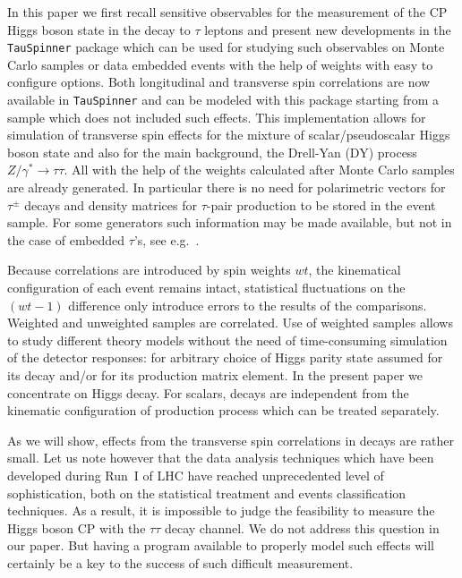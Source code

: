 \documentclass[12pt]{article}
\begin{document}
In  this paper we first recall sensitive observables for the measurement of the
CP Higgs boson state in the decay to $\tau$ leptons and present new developments in the 
{\tt TauSpinner} package which can be used for studying such observables on 
 Monte Carlo samples or data embedded events with the help of weights with easy to configure options. Both longitudinal and 
 transverse spin 
correlations are now available in {\tt TauSpinner} \cite{Czyczula:2012ny,Banerjee:2012ez, TauSpinner2014} 
and can be modeled with this package 
starting from a sample which does not included such effects.  This implementation allows for simulation 
of transverse spin effects for the mixture of scalar/pseudoscalar Higgs boson state and also for 
the main background, the Drell-Yan (DY) process $Z/\gamma^* \to \tau \tau$. 
All with the help of the weights calculated after Monte Carlo samples are already generated. In particular there is no need for polarimetric vectors for $\tau^\pm $ decays and density matrices for $\tau$-pair 
production to be stored in the event sample.  For some generators 
such information may be made available,  
but not  in the case of embedded $\tau$'s, see e.g.~\cite{ATLASHtautau}. 

Because correlations are introduced  by spin weights $wt$, the kinematical configuration of each event remains
intact,  
 statistical fluctuations on the $(wt-1)$ difference only 
introduce errors to the results of  
the comparisons.  Weighted and unweighted samples are correlated.  
Use of weighted samples allows  to study different theory models
without the need of time-consuming simulation of  the
detector responses: for arbitrary 
choice of  Higgs parity state assumed for its decay and/or for its production matrix element.
In the present paper we  concentrate on Higgs decay. For scalars, decays are independent from the
kinematic configuration of  production process which can be treated separately. 

As we will show, effects from the transverse spin correlations in decays are rather small. 
Let us note however that the data analysis techniques which have been developed during Run~I of LHC
have reached unprecedented level of sophistication, both on the statistical treatment and events 
classification techniques. As a result, it is  impossible to judge the feasibility  to measure the 
Higgs boson CP with the $\tau\tau$ decay channel. We do not address this question in our paper.
But having a program available  to properly model such effects  will certainly be a key to the success 
of such difficult measurement.    
\end{document}
